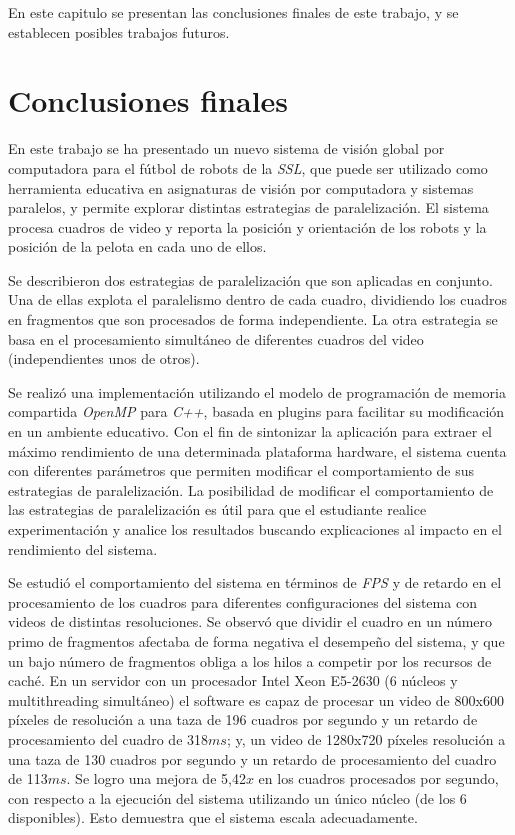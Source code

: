 
En este capitulo se presentan las conclusiones finales de este trabajo, y se
establecen posibles trabajos futuros.

\section{Conclusiones finales}

\label{concluciones}

En este trabajo se ha presentado un nuevo sistema de visión global por
computadora para el fútbol de robots de la \emph{SSL}, que puede ser utilizado
como herramienta educativa en asignaturas de visión por computadora y sistemas
paralelos, y permite explorar distintas estrategias de paralelización. El
sistema procesa cuadros de video y reporta la posición y orientación de los
robots y la posición de la pelota en cada uno de ellos.

Se describieron dos estrategias de paralelización que son aplicadas en conjunto.
Una de ellas explota el paralelismo dentro de cada cuadro, dividiendo los
cuadros en fragmentos que son procesados de forma independiente. La otra
estrategia se basa en el procesamiento simultáneo de diferentes cuadros del
video (independientes unos de otros).

Se realizó una implementación utilizando el modelo de programación de memoria
compartida \emph{OpenMP} para \emph{C++}, basada en plugins para facilitar su
modificación en un ambiente educativo. Con el fin de sintonizar la aplicación
para extraer el máximo rendimiento de una determinada plataforma hardware, el
sistema cuenta con diferentes parámetros que permiten modificar el
comportamiento de sus estrategias de paralelización. La posibilidad de modificar
el comportamiento de las estrategias de paralelización es útil para que el
estudiante realice experimentación y analice los resultados buscando
explicaciones al impacto en el rendimiento del sistema.

Se estudió el comportamiento del sistema en términos de \emph{FPS} y de retardo
en el procesamiento de los cuadros para diferentes configuraciones del sistema
con videos de distintas resoluciones. Se observó que dividir el cuadro
en un número primo de fragmentos afectaba de forma negativa el desempeño del
sistema, y que un bajo número de fragmentos obliga a los hilos a competir por
los recursos de caché. En un servidor con un procesador Intel Xeon E5-2630 (6
núcleos y multithreading simultáneo) el software es capaz de procesar un video
de 800x600 píxeles de resolución a una taza de 196 cuadros por segundo y un
retardo de procesamiento del cuadro de 318$ms$; y, un video de 1280x720 píxeles
resolución a una taza de 130 cuadros por segundo y un retardo de procesamiento
del cuadro de 113$ms$. Se logro una mejora de 5,42$x$ en los cuadros procesados
por segundo, con respecto a la ejecución del sistema utilizando un único núcleo
(de los 6 disponibles). Esto demuestra que el sistema escala adecuadamente.

